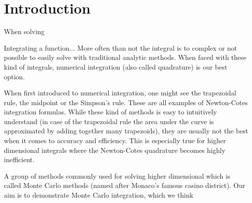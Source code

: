 \section{Introduction}
When solving 

Integrating a function... More often than not the integral is to complex or not
possible to easily solve with traditional analytic methods. When faced with
these kind of integrals, numerical integration (also called quadrature) is our
best option.

When first introduced to numerical integration, one might see the trapezoidal
rule, the midpoint or the Simpson's rule. These are all examples of
Newton-Cotes integration formulas. While these kind of methods is easy to
intuitively understand (in case of the trapezoidal rule the area under the curve
is approximated by adding together many trapezoids), they are usually not the
best when it comes to accuracy and efficiency. This is especially true for
higher dimensional integrals where the Newton-Cotes quadrature becomes highly
inefficient.   

A group of methods commonly used for solving higher dimensional which is called
Monte Carlo methods (named after Monaco's famous casino district). Our aim is to
demonstrate Monte Carlo integration, which we think 
